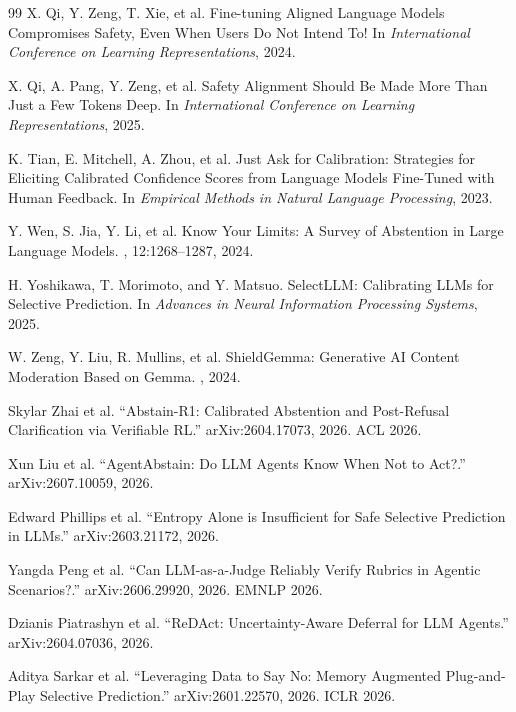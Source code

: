 \documentclass[11pt]{book}
\begin{document}
\begin{thebibliography}{99}
X. Qi, Y. Zeng, T. Xie, et al.
\newblock Fine-tuning Aligned Language Models Compromises Safety, Even When Users Do Not Intend To!
\newblock In {\em International Conference on Learning Representations}, 2024.

X. Qi, A. Pang, Y. Zeng, et al.
\newblock Safety Alignment Should Be Made More Than Just a Few Tokens Deep.
\newblock In {\em International Conference on Learning Representations}, 2025.

K. Tian, E. Mitchell, A. Zhou, et al.
\newblock Just Ask for Calibration: Strategies for Eliciting Calibrated Confidence Scores from Language Models Fine-Tuned with Human Feedback.
\newblock In {\em Empirical Methods in Natural Language Processing}, 2023.

Y. Wen, S. Jia, Y. Li, et al.
\newblock Know Your Limits: A Survey of Abstention in Large Language Models.
, 12:1268--1287, 2024.

H. Yoshikawa, T. Morimoto, and Y. Matsuo.
\newblock SelectLLM: Calibrating LLMs for Selective Prediction.
\newblock In {\em Advances in Neural Information Processing Systems}, 2025.

W. Zeng, Y. Liu, R. Mullins, et al.
\newblock ShieldGemma: Generative AI Content Moderation Based on Gemma.
, 2024.


Skylar Zhai et al.
``Abstain-R1: Calibrated Abstention and Post-Refusal Clarification via Verifiable RL.''
arXiv:2604.17073, 2026. ACL 2026.

Xun Liu et al.
``AgentAbstain: Do LLM Agents Know When Not to Act?.''
arXiv:2607.10059, 2026.

Edward Phillips et al.
``Entropy Alone is Insufficient for Safe Selective Prediction in LLMs.''
arXiv:2603.21172, 2026.

Yangda Peng et al.
``Can LLM-as-a-Judge Reliably Verify Rubrics in Agentic Scenarios?.''
arXiv:2606.29920, 2026. EMNLP 2026.

Dzianis Piatrashyn et al.
``ReDAct: Uncertainty-Aware Deferral for LLM Agents.''
arXiv:2604.07036, 2026.

Aditya Sarkar et al.
``Leveraging Data to Say No: Memory Augmented Plug-and-Play Selective Prediction.''
arXiv:2601.22570, 2026. ICLR 2026.


\end{thebibliography}
\end{document}
